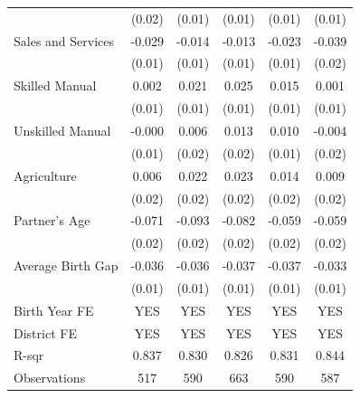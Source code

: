 \begin{longtable}{l*{5}{c}}
                    & (0.02) & (0.01) & (0.01) & (0.01) & (0.01) \\
\hspace{1em}Sales and Services & -0.029\sym{**} & -0.014 & -0.013 & -0.023\sym{**} & -0.039\sym{**} \\
                    & (0.01) & (0.01) & (0.01) & (0.01) & (0.02) \\
\hspace{1em}Skilled Manual & 0.002 & 0.021 & 0.025\sym{**} & 0.015 & 0.001 \\
                    & (0.01) & (0.01) & (0.01) & (0.01) & (0.01) \\
\hspace{1em}Unskilled Manual & -0.000 & 0.006 & 0.013 & 0.010 & -0.004 \\
                    & (0.01) & (0.02) & (0.02) & (0.01) & (0.02) \\
\hspace{1em}Agriculture & 0.006 & 0.022 & 0.023 & 0.014 & 0.009 \\
                    & (0.02) & (0.02) & (0.02) & (0.02) & (0.02) \\
Partner's Age & -0.071\sym{***} & -0.093\sym{***} & -0.082\sym{***} & -0.059\sym{***} & -0.059\sym{***} \\
                    & (0.02) & (0.02) & (0.02) & (0.02) & (0.02) \\
Average Birth Gap & -0.036\sym{***} & -0.036\sym{***} & -0.037\sym{***} & -0.037\sym{***} & -0.033\sym{***} \\
                    & (0.01) & (0.01) & (0.01) & (0.01) & (0.01) \\
\hline
Birth Year FE & YES & YES & YES & YES & YES \\
District FE & YES & YES & YES & YES & YES \\
R-sqr & 0.837 & 0.830 & 0.826 & 0.831 & 0.844 \\
Observations & 517 & 590 & 663 & 590 & 587 \\
\hline \hline

\end{longtable}